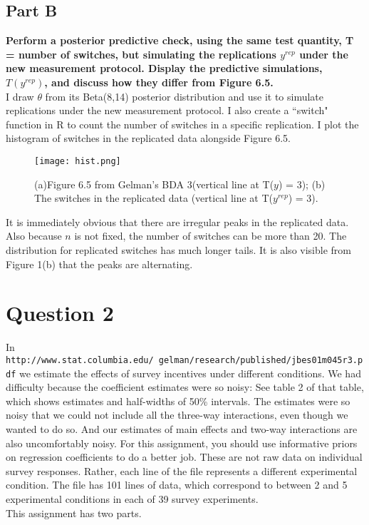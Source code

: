 \documentclass{article}
\begin{document}
\subsection{Part B}
\textbf{ Perform a posterior predictive check, using the same test quantity, T = number of switches, but simulating the replications $y^{rep}$ under the new measurement protocol. Display the predictive simulations, $T(y^{rep})$, and discuss how they differ from Figure 6.5.}\\
I draw $\theta$ from its Beta(8,14) posterior distribution and use it to simulate replications under the new measurement protocol. I also create a ``switch" function in R to count the number of switches in a specific replication. I plot the histogram of switches in the replicated data alongside Figure 6.5.
 \begin{figure}[H]
\centering
\texttt{[image: hist.png]}
\caption{(a)Figure 6.5 from Gelman's BDA 3(vertical line at T($y$) = 3); (b) The switches in the replicated data (vertical line at T($y^{rep}$) = 3).}
\label{deltat}
\end{figure}
It is immediately obvious that there are irregular peaks in the replicated data. Also because $n$ is not fixed, the number of switches can be more than 20. The distribution for replicated switches has much longer tails. It is also visible from Figure 1(b) that the peaks are alternating.

\section{Question 2}
In \texttt{http://www.stat.columbia.edu/~gelman/research/published/jbes01m045r3.pdf} we estimate the effects of survey incentives under different conditions. We had difficulty because the coefficient estimates were so noisy: See table 2 of that table, which shows estimates and half-widths of 50\% intervals. The estimates were so noisy that we could not include all the three-way interactions, even though we wanted to do so. And our estimates of main effects and two-way interactions are also uncomfortably noisy.
For this assignment, you should use informative priors on regression coefficients to do a better job. These are not raw data on individual survey responses. Rather, each line of the file represents a different experimental condition. The file has 101 lines of data, which correspond to between 2 and 5 experimental conditions in each of 39 survey experiments.\\
This assignment has two parts.
\end{document}
